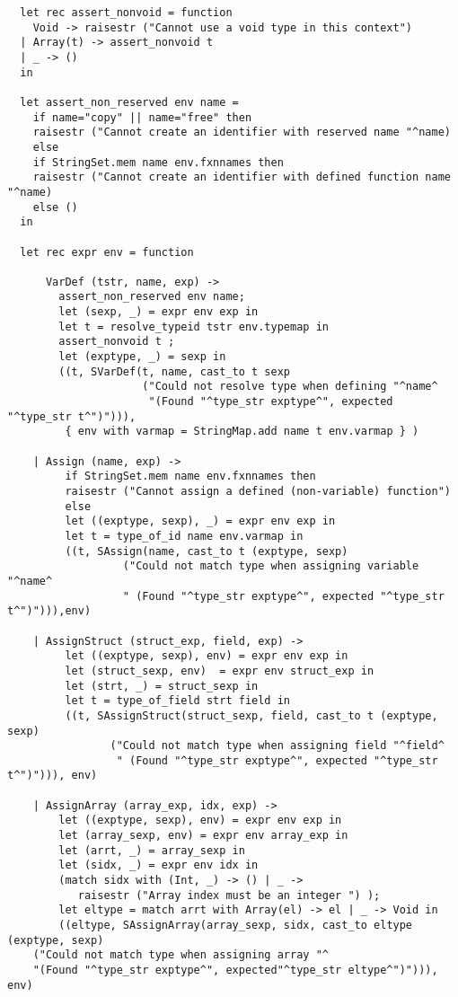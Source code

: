 \documentclass[main.tex]{subfiles}
\begin{document}
\begin{lstlisting}
  let rec assert_nonvoid = function
    Void -> raisestr ("Cannot use a void type in this context")
  | Array(t) -> assert_nonvoid t
  | _ -> ()
  in

  let assert_non_reserved env name =
    if name="copy" || name="free" then
    raisestr ("Cannot create an identifier with reserved name "^name)
    else
    if StringSet.mem name env.fxnnames then
    raisestr ("Cannot create an identifier with defined function name "^name)
    else ()
  in

  let rec expr env = function
     
      VarDef (tstr, name, exp) -> 
        assert_non_reserved env name;
        let (sexp, _) = expr env exp in
        let t = resolve_typeid tstr env.typemap in
        assert_nonvoid t ;
        let (exptype, _) = sexp in
        ((t, SVarDef(t, name, cast_to t sexp
                     ("Could not resolve type when defining "^name^
                      "(Found "^type_str exptype^", expected "^type_str t^")"))),
         { env with varmap = StringMap.add name t env.varmap } )

    | Assign (name, exp) ->
         if StringSet.mem name env.fxnnames then
         raisestr ("Cannot assign a defined (non-variable) function")
         else
         let ((exptype, sexp), _) = expr env exp in
         let t = type_of_id name env.varmap in
         ((t, SAssign(name, cast_to t (exptype, sexp)
                  ("Could not match type when assigning variable "^name^
                  " (Found "^type_str exptype^", expected "^type_str t^")"))),env)

    | AssignStruct (struct_exp, field, exp) ->
         let ((exptype, sexp), env) = expr env exp in
         let (struct_sexp, env)  = expr env struct_exp in 
         let (strt, _) = struct_sexp in
         let t = type_of_field strt field in
         ((t, SAssignStruct(struct_sexp, field, cast_to t (exptype, sexp)
                ("Could not match type when assigning field "^field^
                 " (Found "^type_str exptype^", expected "^type_str t^")"))), env)

    | AssignArray (array_exp, idx, exp) ->
        let ((exptype, sexp), env) = expr env exp in
        let (array_sexp, env) = expr env array_exp in
        let (arrt, _) = array_sexp in
        let (sidx, _) = expr env idx in
        (match sidx with (Int, _) -> () | _ ->
           raisestr ("Array index must be an integer ") );
        let eltype = match arrt with Array(el) -> el | _ -> Void in
        ((eltype, SAssignArray(array_sexp, sidx, cast_to eltype (exptype, sexp)
    ("Could not match type when assigning array "^
    "(Found "^type_str exptype^", expected"^type_str eltype^")"))), env)


\end{lstlisting}
\end{document}
